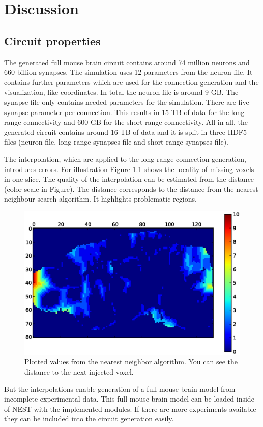 %

\chapter{Discussion}

\section{Circuit properties}


The generated full mouse brain circuit contains around 74 million neurons and 660 billion synapses.
The simulation uses 12 parameters from the neuron file.
It contains further parameters which are used for the connection generation and the visualization,
like coordinates. In total the neuron file is around 9 GB.
The synapse file only contains needed parameters for the simulation.
There are five synapse parameter per connection. This results in 15 TB of data
for the long range connectivity and 600 GB for the short range connectivity.
All in all, the generated circuit contains around 16 TB of data and it is split in three HDF5
files (neuron file, long range synapses file and short range synapses file).

The interpolation, which are applied to the long range connection generation, introduces errors.
For illustration Figure \ref{interpolationdistance} shows the locality of missing voxels in one slice.
The quality of the interpolation can be estimated from the distance (color scale in Figure).
The distance corresponds to the distance from the nearest neighbour search algorithm.
It highlights problematic regions.
\begin{figure}[ht!]
\centering
\includegraphics[scale=0.5]{pictures/distance_x_y_70.eps}
\caption{Plotted values from the nearest neighbor algorithm. You can see the distance to the next injected voxel.}
\label{interpolationdistance}
\end{figure}
But the interpolations enable generation of a full mouse brain model from incomplete experimental data.
This full mouse brain model can be loaded inside of NEST with the implemented modules.
If there are more experiments available they can be included into
the circuit generation easily.

